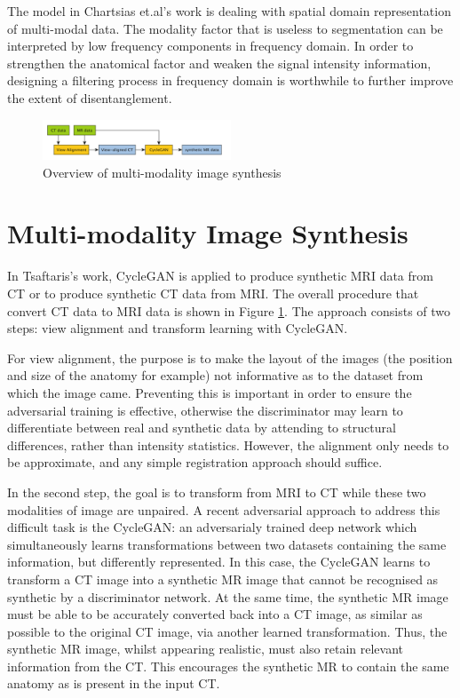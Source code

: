\documentclass[10pt,sigconf,letterpaper,nonacm]{acmart}
\begin{document}
 The model in Chartsias et.al's work \cite{chartsias2019multi} is dealing with spatial domain representation of multi-modal data. The modality factor that is useless to segmentation can be interpreted by low frequency components in frequency domain. In order to strengthen the anatomical factor and weaken the signal intensity information, designing a filtering process in frequency domain is worthwhile to further improve the extent of disentanglement.
\begin{figure}
	\centering
	\includegraphics[width=0.5\textwidth]{images/Xiangyu_overview.png}
	\caption{Overview of multi-modality image synthesis}
	\label{Xiangyu_overview}
\end{figure} 


\section{Multi-modality Image Synthesis}
 In Tsaftaris's work\cite{Tsaftaris2017}, CycleGAN is applied to produce synthetic MRI data from CT or to produce synthetic CT data from MRI. The overall procedure that convert CT data to MRI data is shown in Figure \ref{Xiangyu_overview}. The approach consists of two steps: view alignment and transform learning with CycleGAN. 
 
 For view alignment, the purpose is to make the layout of the images (the position and size of the anatomy for example) not informative as to the dataset from which the image came. Preventing this is important in order to ensure the adversarial training is effective, otherwise the discriminator may learn to differentiate between real and synthetic data by attending to structural differences, rather than intensity statistics. However, the alignment only needs to be approximate, and any simple registration approach should suffice.
 
 In the second step, the goal is to transform from MRI to CT while these two modalities of image are unpaired. A recent adversarial approach to address this difficult task is the CycleGAN\cite{zhu2017unpaired}: an adversarialy trained deep network which simultaneously learns transformations between two datasets containing the same information, but differently represented. In this case, the CycleGAN learns to transform a CT image into a synthetic MR image that cannot be recognised as synthetic by a discriminator network. At the same time, the synthetic MR image must be able to be accurately converted back into a CT image, as similar as possible to the original CT image, via another learned transformation. Thus, the synthetic MR image, whilst appearing realistic, must also retain relevant information from the CT. This encourages the synthetic MR to contain the same anatomy as is present in the input CT. 
 
\end{document}
